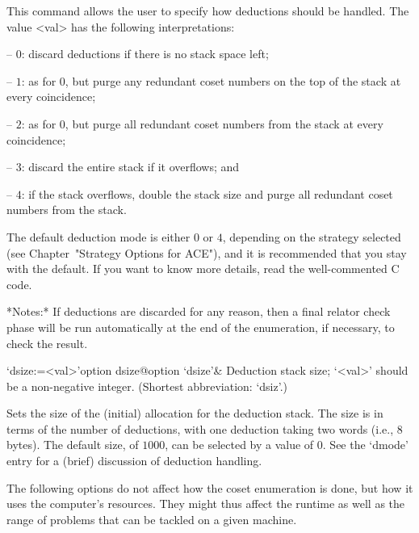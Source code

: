 This command allows the user  to  specify  how  deductions  should  be
handled. The value <val> has the following interpretations:

\beginlist

\item{--} $0$:  
discard deductions if there is no stack space left;

\item{--} $1$: 
as for $0$, but purge any redundant coset numbers on the  top  of  the
stack at every coincidence;

\item{--} $2$: 
as for 0, but purge all redundant coset  numbers  from  the  stack  at
every coincidence;

\item{--} $3$:
discard the entire stack if it overflows; and

\item{--} $4$:
if the stack overflows, double the stack size and purge all  redundant
coset numbers from the stack.

\endlist

The default deduction mode is either $0$  or  $4$,  depending  on  the
strategy selected (see Chapter~"Strategy Options for ACE"), and it  is
recommended that you stay with the default. If you want to  know  more
details, read the well-commented C code.

*Notes:*
If deductions are discarded for any reason, then a final relator check
phase  will be run  automatically at  the end  of the  enumeration, if
necessary, to check the result.

\>`dsize:=<val>'{option dsize}@{option `dsize'}&
Deduction stack size; `<val>' should be a non-negative integer.
(Shortest abbreviation: `dsiz'.)

Sets the  size of  the (initial) allocation  for the  deduction stack.
The size is  in terms of the number of  deductions, with one deduction
taking two words (i.e., 8 bytes).  The default size, of $1000$, can be
selected  by  a value  of  0.   See the  `dmode' entry  for a  (brief)
discussion of deduction handling.

\enditems


The following options do not affect how the coset enumeration is done,
but how it  uses the computer's resources. They  might thus affect the
runtime as  well as  the range of  problems that  can be tackled  on a
given machine.

